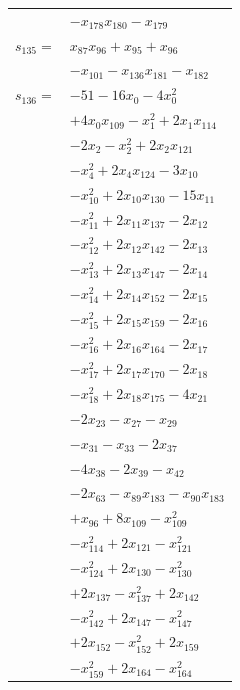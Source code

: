 \begin{longtable}{@{}r@{\;}l@{}}
 & \(\displaystyle -x_{178}x_{180} -x_{179}\) \\[3pt]
\(s_{135}=\) & \(\displaystyle x_{87}x_{96} +x_{95} +x_{96}\) \\
 & \(\displaystyle -x_{101} -x_{136}x_{181} -x_{182}\) \\[3pt]
\(s_{136}=\) & \(\displaystyle -51 -16x_{0} -4x_{0}^{2}\) \\
 & \(\displaystyle +4x_{0}x_{109} -x_{1}^{2} +2x_{1}x_{114}\) \\
 & \(\displaystyle -2x_{2} -x_{2}^{2} +2x_{2}x_{121}\) \\
 & \(\displaystyle -x_{4}^{2} +2x_{4}x_{124} -3x_{10}\) \\
 & \(\displaystyle -x_{10}^{2} +2x_{10}x_{130} -15x_{11}\) \\
 & \(\displaystyle -x_{11}^{2} +2x_{11}x_{137} -2x_{12}\) \\
 & \(\displaystyle -x_{12}^{2} +2x_{12}x_{142} -2x_{13}\) \\
 & \(\displaystyle -x_{13}^{2} +2x_{13}x_{147} -2x_{14}\) \\
 & \(\displaystyle -x_{14}^{2} +2x_{14}x_{152} -2x_{15}\) \\
 & \(\displaystyle -x_{15}^{2} +2x_{15}x_{159} -2x_{16}\) \\
 & \(\displaystyle -x_{16}^{2} +2x_{16}x_{164} -2x_{17}\) \\
 & \(\displaystyle -x_{17}^{2} +2x_{17}x_{170} -2x_{18}\) \\
 & \(\displaystyle -x_{18}^{2} +2x_{18}x_{175} -4x_{21}\) \\
 & \(\displaystyle -2x_{23} -x_{27} -x_{29}\) \\
 & \(\displaystyle -x_{31} -x_{33} -2x_{37}\) \\
 & \(\displaystyle -4x_{38} -2x_{39} -x_{42}\) \\
 & \(\displaystyle -2x_{63} -x_{89}x_{183} -x_{90}x_{183}\) \\
 & \(\displaystyle +x_{96} +8x_{109} -x_{109}^{2}\) \\
 & \(\displaystyle -x_{114}^{2} +2x_{121} -x_{121}^{2}\) \\
 & \(\displaystyle -x_{124}^{2} +2x_{130} -x_{130}^{2}\) \\
 & \(\displaystyle +2x_{137} -x_{137}^{2} +2x_{142}\) \\
 & \(\displaystyle -x_{142}^{2} +2x_{147} -x_{147}^{2}\) \\
 & \(\displaystyle +2x_{152} -x_{152}^{2} +2x_{159}\) \\
 & \(\displaystyle -x_{159}^{2} +2x_{164} -x_{164}^{2}\) \\

\end{longtable}
